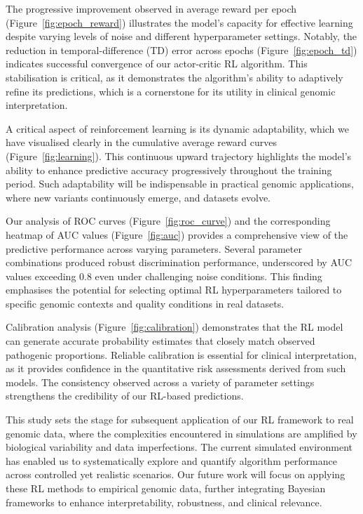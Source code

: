 The progressive improvement observed in average reward per epoch (Figure~\ref{fig:epoch_reward}) illustrates the model's capacity for effective learning despite varying levels of noise and different hyperparameter settings. Notably, the reduction in temporal-difference (TD) error across epochs (Figure~\ref{fig:epoch_td}) indicates successful convergence of our actor-critic RL algorithm. This stabilisation is critical, as it demonstrates the algorithm's ability to adaptively refine its predictions, which is a cornerstone for its utility in clinical genomic interpretation.

A critical aspect of reinforcement learning is its dynamic adaptability, which we have visualised clearly in the cumulative average reward curves (Figure~\ref{fig:learning}). This continuous upward trajectory highlights the model's ability to enhance predictive accuracy progressively throughout the training period. Such adaptability will be indispensable in practical genomic applications, where new variants continuously emerge, and datasets evolve.

Our analysis of ROC curves (Figure~\ref{fig:roc_curve}) and the corresponding heatmap of AUC values (Figure~\ref{fig:auc}) provides a comprehensive view of the predictive performance across varying parameters. Several parameter combinations produced robust discrimination performance, underscored by AUC values exceeding 0.8 even under challenging noise conditions. This finding emphasises the potential for selecting optimal RL hyperparameters tailored to specific genomic contexts and quality conditions in real datasets.

Calibration analysis (Figure~\ref{fig:calibration}) demonstrates that the RL model can generate accurate probability estimates that closely match observed pathogenic proportions. Reliable calibration is essential for clinical interpretation, as it provides confidence in the quantitative risk assessments derived from such models. The consistency observed across a variety of parameter settings strengthens the credibility of our RL-based predictions.

This study sets the stage for subsequent application of our RL framework to real genomic data, where the complexities encountered in simulations are amplified by biological variability and data imperfections. The current simulated environment has enabled us to systematically explore and quantify algorithm performance across controlled yet realistic scenarios. Our future work will focus on applying these RL methods to empirical genomic data, further integrating Bayesian frameworks to enhance interpretability, robustness, and clinical relevance.

